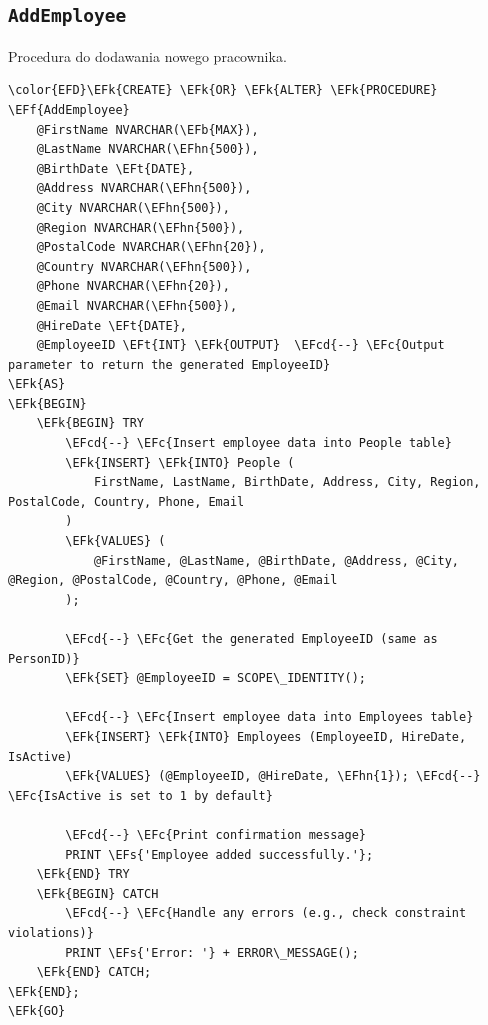 \documentclass[11pt]{article}
\newcommand{\EFc}[1]{\textcolor{EFc}{\textit{#1}}} %
\newcommand{\EFcd}[1]{\textcolor{EFcd}{\textit{#1}}} %
\newcommand{\EFs}[1]{\textcolor{EFs}{#1}} %
\newcommand{\EFk}[1]{\textcolor{EFk}{\textbf{#1}}} %
\newcommand{\EFb}[1]{\textcolor{EFb}{\textbf{#1}}} %
\newcommand{\EFf}[1]{\textcolor{EFf}{#1}} %
\newcommand{\EFt}[1]{\textcolor{EFt}{\textbf{#1}}} %
\newcommand{\EFhn}[1]{\textcolor{EFhn}{#1}} %
\begin{document}
\subsection{\texttt{AddEmployee}}
\label{sec:org5853c53}
Procedura do dodawania nowego pracownika.
\begin{Code}
\begin{Verbatim}
\color{EFD}\EFk{CREATE} \EFk{OR} \EFk{ALTER} \EFk{PROCEDURE} \EFf{AddEmployee}
    @FirstName NVARCHAR(\EFb{MAX}),
    @LastName NVARCHAR(\EFhn{500}),
    @BirthDate \EFt{DATE},
    @Address NVARCHAR(\EFhn{500}),
    @City NVARCHAR(\EFhn{500}),
    @Region NVARCHAR(\EFhn{500}),
    @PostalCode NVARCHAR(\EFhn{20}),
    @Country NVARCHAR(\EFhn{500}),
    @Phone NVARCHAR(\EFhn{20}),
    @Email NVARCHAR(\EFhn{500}),
    @HireDate \EFt{DATE},
    @EmployeeID \EFt{INT} \EFk{OUTPUT}  \EFcd{--} \EFc{Output parameter to return the generated EmployeeID}
\EFk{AS}
\EFk{BEGIN}
    \EFk{BEGIN} TRY
        \EFcd{--} \EFc{Insert employee data into People table}
        \EFk{INSERT} \EFk{INTO} People (
            FirstName, LastName, BirthDate, Address, City, Region, PostalCode, Country, Phone, Email
        )
        \EFk{VALUES} (
            @FirstName, @LastName, @BirthDate, @Address, @City, @Region, @PostalCode, @Country, @Phone, @Email
        );

        \EFcd{--} \EFc{Get the generated EmployeeID (same as PersonID)}
        \EFk{SET} @EmployeeID = SCOPE\_IDENTITY();

        \EFcd{--} \EFc{Insert employee data into Employees table}
        \EFk{INSERT} \EFk{INTO} Employees (EmployeeID, HireDate, IsActive)
        \EFk{VALUES} (@EmployeeID, @HireDate, \EFhn{1}); \EFcd{--} \EFc{IsActive is set to 1 by default}

        \EFcd{--} \EFc{Print confirmation message}
        PRINT \EFs{'Employee added successfully.'};
    \EFk{END} TRY
    \EFk{BEGIN} CATCH
        \EFcd{--} \EFc{Handle any errors (e.g., check constraint violations)}
        PRINT \EFs{'Error: '} + ERROR\_MESSAGE();
    \EFk{END} CATCH;
\EFk{END};
\EFk{GO}
\end{Verbatim}
\end{Code}
\end{document}
